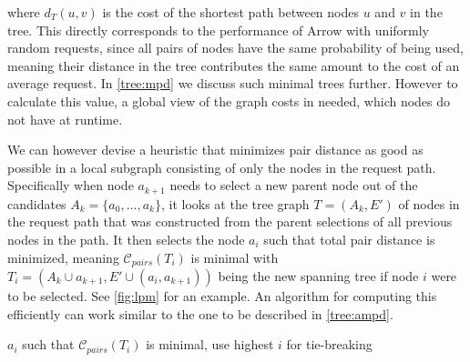 \documentclass[a4paper, oneside]{discothesis}
\begin{document}
where $d_T(u,v)$ is the cost of the shortest path between nodes $u$ and $v$ in the tree. This directly corresponds to the performance of Arrow with uniformly random requests, since all pairs of nodes have the same probability of being used, meaning their distance in the tree contributes the same amount to the cost of an average request. In \autoref{tree:mpd} we discuss such minimal trees further. However to calculate this value, a global view of the graph costs in needed, which nodes do not have at runtime.

We can however devise a heuristic that minimizes pair distance as good as possible in a local subgraph consisting of only the nodes in the request path. Specifically when node $a_{k+1}$ needs to select a new parent node out of the candidates $A_k=\{a_{0},\dots,a_{k}\}$, it looks at the tree graph $T=(A_k,E')$ of nodes in the request path that was constructed from the parent selections of all previous nodes in the path. It then selects the node $a_{i}$ such that total pair distance is minimized, meaning $\mathcal{C}_{pairs}(T_i)$ is minimal with $T_i=(A_k\cup a_{k+1},E'\cup(a_{i},a_{k+1}))$ being the new spanning tree if node $i$ were to be selected. See \autoref{fig:lpm} for an example. An algorithm for computing this efficiently can work similar to the one to be described in \autoref{tree:ampd}.

\begin{algorithmic}
\State\Return$a_{i}$ such that $\mathcal{C}_{pairs}(T_i)$ is minimal, use highest $i$ for tie-breaking
\EndFunction
\end{algorithmic}
\end{document}

